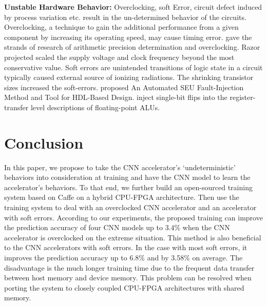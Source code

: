 \textbf{Unstable Hardware Behavior:} Overclocking, soft Error, circuit defect induced by process 
variation etc. result in the un-determined behavior of the circuits.  Overclocking, a technique to gain 
the additional performance from a given component by increasing its operating speed, may cause timing error. \cite{overclock_3} gave 
the strands of research of arithmetic precision determination and overclocking. Razor\cite{Razor_15}  projected scaled 
the supply voltage and clock frequency beyond the most conservative value. Soft errors are unintended 
transitions of logic state in a circuit typically caused external source of ionizing radiations. 
The shrinking transistor sizes increased the soft-errors. \cite{Mansour_20} proposed An Automated SEU 
Fault-Injection Method and Tool for HDL-Based Design. \cite{Subasi_30} inject single-bit flips into the register-transfer 
level descriptions of floating-point ALUs.

\section{Conclusion} \label{sec:Conclusion}
In this paper, we propose to take the CNN accelerator’s ‘undeterministic’ behaviors into consideration 
at training and have the CNN model to learn the accelerator’s behaviors. To that end, we further build 
an open-sourced training system based on Caffe on a hybrid CPU-FPGA architecture. Then use the training 
system to deal with an overclocked CNN accelerator and an accelerator with soft errors. According to our 
experiments, the proposed training can improve the prediction accuracy of four CNN models up to 3.4\% when 
the CNN accelerator is overclocked on the extreme situation. This method is also beneficial to the CNN 
accelerators with soft errors. In the case with most soft errors, it improves the prediction accuracy up 
to 6.8\% and by 3.58\% on average. The disadvantage is the much longer training time due to the frequent 
data transfer between host memory and device memory. This problem can be resolved when porting the system 
to closely coupled CPU-FPGA architectures with shared memory.




